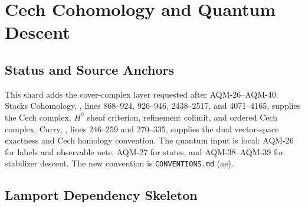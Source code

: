 
\section{Cech Cohomology and Quantum Descent}
\label{sec:cech-cohomology-quantum-descent}

\subsection{Status and Source Anchors}

This shard adds the cover-complex layer requested after AQM-26--AQM-40.
Stacks Cohomology,
, lines
868--924, 926--946, 2438--2517, and 4071--4165, supplies the Cech complex,
\(H^0\) sheaf criterion, refinement colimit, and ordered Cech complex.  Curry,
,
lines 246--259 and 270--335, supplies the dual vector-space exactness and
Cech homology convention.  The quantum input is local: AQM-26 for labels and
observable nets, AQM-27 for states, and AQM-38--AQM-39 for stabilizer descent.
The new convention is \texttt{CONVENTIONS.md} (ae).

\subsection{Lamport Dependency Skeleton}


